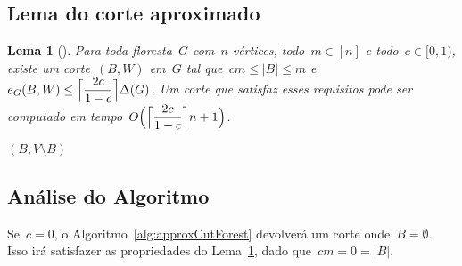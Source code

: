 \documentclass[a4paper,12pt]{article}
\DeclarePairedDelimiter\ceil{\lceil}{\rceil}
\newtheorem{lem}{Lema}
\begin{document}
\bigskip
\bigskip
\bigskip



\subsection{Lema do corte aproximado}

\begin{lem}[{\cite[Lema 3]{Schmidt15}}]
\label{lema:approxCutForest}
	Para toda floresta~$G$ com~$n$ vértices, todo~$m \in [n]$ e 
	todo~$c \in [0,1)$, existe um corte~$(B,W)$ em~$G$ tal 
	que~$cm \le |B| \le m$ 
	e~$e_G(B,W) \le \ceil[\Big]{ \dfrac{2c}{1-c}} \Delta(G)$.
	Um corte que satisfaz esses requisitos pode ser computado em
	tempo~$O\Big(\ceil[\Big]{ \dfrac{2c}{1-c}} n+1\Big)$.
\end{lem}

\medskip
\medskip

\begin{algorithm}[H]
\label{alg:approxCutForest}

	\caption{Computa corte aproximado em uma floresta}
	\Return $(B,V\setminus B)$

\end{algorithm}	

\bigskip
\bigskip
\bigskip

\subsection*{Análise do Algoritmo}

	Se~$c=0$, o Algoritmo~\ref{alg:approxCutForest} devolverá
	um corte onde~$B=\emptyset$. Isso irá satisfazer as 
	propriedades do Lema~\ref{lema:approxCutForest}, dado 
	que~$cm=0=|B|$.
\end{document}
